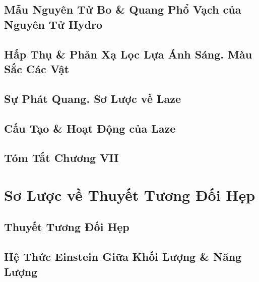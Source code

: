 \documentclass{article}
\numberwithin{equation}{section}
\begin{document}
\subsection{Mẫu Nguyên Tử Bo \& Quang Phổ Vạch của Nguyên Tử Hydro}


\subsection{Hấp Thụ \& Phản Xạ Lọc Lựa Ánh Sáng. Màu Sắc Các Vật}


\subsection{Sự Phát Quang. Sơ Lược về Laze}


\subsection{Cấu Tạo \& Hoạt Động của Laze}


\subsection{Tóm Tắt Chương VII}


\section{Sơ Lược về Thuyết Tương Đối Hẹp}

\subsection{Thuyết Tương Đối Hẹp}


\subsection{Hệ Thức Einstein Giữa Khối Lượng \& Năng Lượng}
\end{document}
